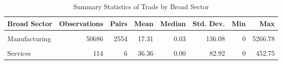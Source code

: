 \begin{table}[!h]
\centering
\caption{\label{tab:tab:trade_sector}Summary Statistics of Trade by Broad Sector}
\centering
\begin{tabular}[t]{lrrrrrrr}
\toprule
Broad Sector & Observations & Pairs & Mean & Median & Std. Dev. & Min & Max\\
\midrule
\cellcolor{gray!10}{Agriculture} & \cellcolor{gray!10}{34389} & \cellcolor{gray!10}{1768} & \cellcolor{gray!10}{2.09} & \cellcolor{gray!10}{0.00} & \cellcolor{gray!10}{14.05} & \cellcolor{gray!10}{0} & \cellcolor{gray!10}{699.26}\\
Manufacturing & 50686 & 2554 & 17.31 & 0.03 & 136.08 & 0 & 5266.78\\
\cellcolor{gray!10}{Mining and Energy} & \cellcolor{gray!10}{24516} & \cellcolor{gray!10}{1244} & \cellcolor{gray!10}{9.32} & \cellcolor{gray!10}{0.00} & \cellcolor{gray!10}{111.20} & \cellcolor{gray!10}{0} & \cellcolor{gray!10}{5111.88}\\
Services & 114 & 6 & 36.36 & 0.00 & 82.92 & 0 & 452.75\\
\bottomrule
\end{tabular}
\end{table}
